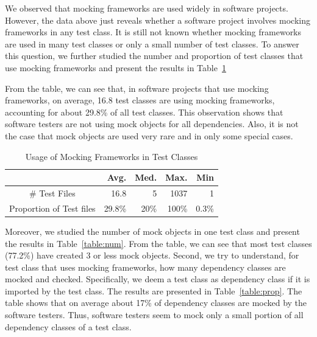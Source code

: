 We observed that mocking frameworks are used widely in software projects. However, the data above just reveals whether a software project involves mocking frameworks in any test class. It is still not known whether mocking frameworks are used in many test classes or only  a small number of test classes. To answer this question, we further studied the number and proportion of test classes that use mocking frameworks and present the results in Table~\ref{table:testclass}

From the table, we can see that, in software projects that use mocking frameworks, on average, 16.8 test classes are using mocking frameworks, accounting for about 29.8\% of all test classes. This observation shows that software testers are not using mock objects for all dependencies. Also, it is not the case that mock objects are used very rare and in only some special cases. 

\begin{table}
\caption{Usage of Mocking Frameworks in Test Classes}


\label{table:testclass}
\centering
\begin{tabular}{|c|r|r|r|r|}
\hline
 & Avg. & Med. & Max. & Min\\
\hline
\# Test Files &16.8&5&1037&1\\
Proportion of Test files &29.8\%&20\%&100\%&0.3\%\\
\hline
\end{tabular}

\end{table}

Moreover, we studied the number of mock objects in one test class and present the results in Table~\ref{table:num}. From the table, we can see that most test classes (77.2\%) have created 3 or less mock objects. Second, we try to understand, for test class that uses mocking frameworks, how many dependency classes are mocked and checked. Specifically, we deem a test class as dependency class if it is imported by the test class. The results are presented in Table~\ref{table:prop}. The table shows that on average about 17\% of dependency classes are mocked by the software testers. Thus, software testers seem to mock only a small portion of all dependency classes of a test class. 

